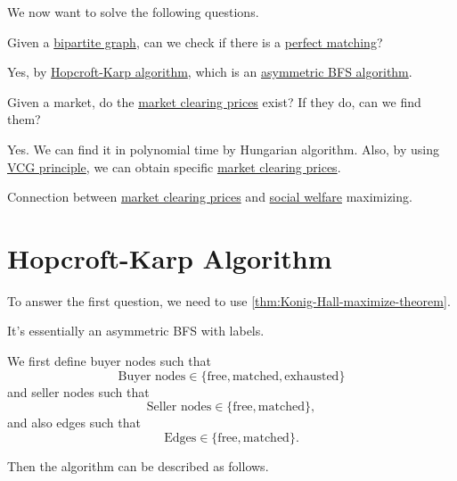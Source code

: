 We now want to solve the following questions.
\begin{problem}
Given a \href{https://en.wikipedia.org/wiki/Bipartite_graph}{bipartite graph}, can we check if there is a \hyperref[def:perfect-matching]{perfect matching}?
\end{problem}
\begin{answer}
	Yes, by \hyperref[sec:Hopcroft-Karp-algorithm]{Hopcroft-Karp algorithm}, which is an \underline{asymmetric BFS algorithm}.
\end{answer}

\begin{problem}
Given a market, do the \hyperref[note:market-clearing-prices]{market clearing prices} exist? If they do, can we find them?
\end{problem}
\begin{answer}
	Yes. We can find it in polynomial time by Hungarian algorithm. Also, by using \hyperref[thm:VCG]{VCG principle},
	we can obtain specific \hyperref[note:market-clearing-prices]{market clearing prices}.
\end{answer}

\begin{problem}
Connection between \hyperref[note:market-clearing-prices]{market clearing prices} and \hyperref[def:social-welfare]{social welfare}
maximizing.
\end{problem}

\section{Hopcroft-Karp Algorithm}\label{sec:Hopcroft-Karp-algorithm}
To answer the first question, we need to use \autoref{thm:Konig-Hall-maximize-theorem}.
\begin{intuition}
	It's essentially an asymmetric BFS with labels.
\end{intuition}

We first define buyer nodes such that
\[
	\text{Buyer nodes}\in \{\text{free}, \text{matched}, \text{exhausted}   \}
\]
and seller nodes such that
\[
	\text{Seller nodes}\in \{\text{free}, \text{matched}\},
\]
and also edges such that
\[
	\text{Edges}\in \{\text{free}, \text{matched}\}.
\]

Then the algorithm can be described as follows.

